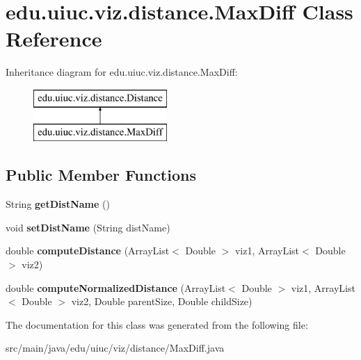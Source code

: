 \hypertarget{classedu_1_1uiuc_1_1viz_1_1distance_1_1_max_diff}{}\section{edu.\+uiuc.\+viz.\+distance.\+Max\+Diff Class Reference}
\label{classedu_1_1uiuc_1_1viz_1_1distance_1_1_max_diff}
Inheritance diagram for edu.\+uiuc.\+viz.\+distance.\+Max\+Diff\+:\begin{figure}[H]
\begin{center}
\leavevmode
\includegraphics[height=2.000000cm]{classedu_1_1uiuc_1_1viz_1_1distance_1_1_max_diff}
\end{center}
\end{figure}
\subsection*{Public Member Functions}
\begin{DoxyCompactItemize}
\item 
\mbox{\label{classedu_1_1uiuc_1_1viz_1_1distance_1_1_max_diff_a23ae56fb601f355ec3048c50a4414f47}} 
String {\bfseries get\+Dist\+Name} ()
\item 
\mbox{\label{classedu_1_1uiuc_1_1viz_1_1distance_1_1_max_diff_a6d67cadf45fd2104765342ca2aef229c}} 
void {\bfseries set\+Dist\+Name} (String dist\+Name)
\item 
\mbox{\label{classedu_1_1uiuc_1_1viz_1_1distance_1_1_max_diff_ad3a41cd44b9af34db4957fe2cc880f82}} 
double {\bfseries compute\+Distance} (Array\+List$<$ Double $>$ viz1, Array\+List$<$ Double $>$ viz2)
\item 
\mbox{\label{classedu_1_1uiuc_1_1viz_1_1distance_1_1_max_diff_ad6c1b7b4ab30bbdd821d23c4f828ac0e}} 
double {\bfseries compute\+Normalized\+Distance} (Array\+List$<$ Double $>$ viz1, Array\+List$<$ Double $>$ viz2, Double parent\+Size, Double child\+Size)
\end{DoxyCompactItemize}


The documentation for this class was generated from the following file\+:\begin{DoxyCompactItemize}
\item 
src/main/java/edu/uiuc/viz/distance/Max\+Diff.\+java\end{DoxyCompactItemize}
